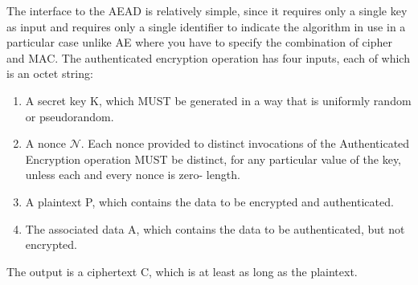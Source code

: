 The interface to the AEAD is relatively simple, since it requires only a single key as input and requires only a single identifier to indicate the algorithm in use in a particular case unlike AE where you have to specify the combination of cipher and MAC. The authenticated encryption operation has four inputs, each of which is an octet string:
\begin{enumerate}
  \item A secret key K, which MUST be generated in a way that is uniformly
        random or pseudorandom.
  \item A nonce $\mathcal{N}$. Each nonce provided to distinct invocations of the
        Authenticated Encryption operation MUST be distinct, for any particular value of the key, unless each and every nonce is zero-
        length.
  \item A plaintext P, which contains the data to be encrypted and authenticated.
  \item The associated data A, which contains the data to be authenticated, but not encrypted.
\end{enumerate}
The output is a ciphertext C, which is at least as long as the plaintext.
